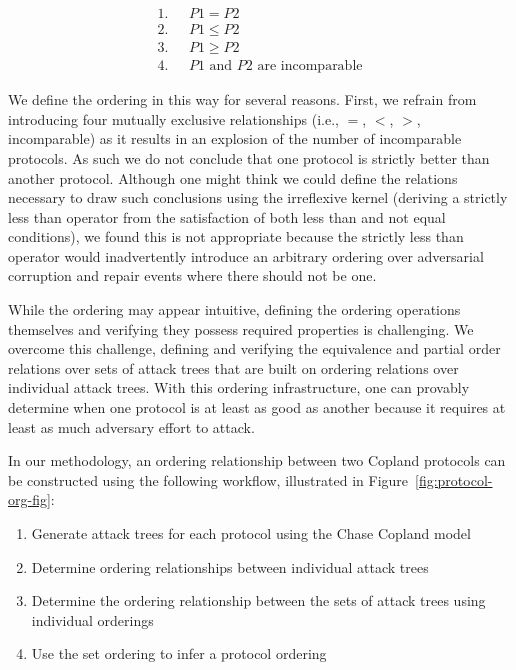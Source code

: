 \documentclass[runningheads]{llncs}
\theoremstyle{definition}
\newcommand{\squash}{\itemsep=0pt\parskip=0pt}
\begin{document}
\vspace*{-5mm}

\begin{align*}
1. & \text{ } P1 = P2 \\
2. & \text{ } P1 \le P2 \\
3. & \text{ } P1 \ge P2 \\
4. & \text{ } P1 \text{ and } P2 \text{ are incomparable}
\end{align*}

\noindent We define the ordering in this way for several
reasons. First, we refrain from introducing four mutually exclusive
relationships (i.e., $=$, $<$, $>$, incomparable) as it results in an
explosion of the number of incomparable protocols. As such we
do not conclude that one protocol is strictly better than another
protocol. Although one might think we could define the relations
necessary to draw such conclusions using the irreflexive kernel
(deriving a strictly less than operator from the satisfaction of both
less than and not equal conditions), we found this is not appropriate
because the strictly less than operator would inadvertently introduce
an arbitrary ordering over adversarial corruption and repair events
where there should not be one.

While the ordering may appear intuitive, defining the ordering
operations themselves and verifying they possess required properties is
challenging. We overcome this challenge, defining and
verifying the equivalence and partial order relations over sets of
attack trees that are built on ordering relations over individual
attack trees. With this ordering infrastructure, one can provably
determine when one protocol is at least as good as another because it
requires at least as much adversary effort to attack.

In our methodology, an ordering relationship between two Copland
protocols can be constructed using the following workflow, illustrated
in Figure~\ref{fig:protocol-org-fig}:

\begin{enumerate}
  \squash
\item Generate attack trees for each protocol using the Chase Copland model
\item Determine ordering relationships between individual attack trees
\item Determine the ordering relationship between the sets of attack
  trees using individual orderings
\item Use the set ordering to infer a protocol ordering
\end{enumerate}
\end{document}
